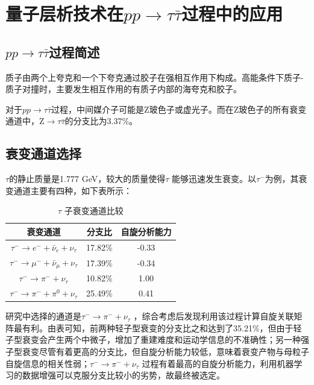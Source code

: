 \section{量子层析技术在$pp\to \tau \bar{\tau}$过程中的应用}
\label{sec:twopthree}

\subsection{$pp \to \tau \bar{\tau}$过程简述}
\label{sec:twopthreepone}

质子由两个上夸克和一个下夸克通过胶子在强相互作用下构成。高能条件下质子-质子对撞时，主要发生相互作用的有质子内部的海夸克和胶子。

对于$pp \to \tau \bar{\tau}$过程，中间媒介子可能是Z玻色子或虚光子。而在Z玻色子的所有衰变通道中，$\mathrm{Z} \to \tau \bar{\tau}$的分支比为3.37\%\cite{ref18}。

\subsection{衰变通道选择}
\label{sec:twopthreeptwo}
$\tau$的静止质量是1.777 GeV，较大的质量使得$\tau$ 能够迅速发生衰变。以$\tau^-$为例，其衰变通道主要有四种，如下表所示：
\begin{table}[htbp]
  \centering
  \caption{$\tau$ 子衰变通道比较}
  \label{tab:tau-decay}
  \renewcommand{\arraystretch}{1.3}
  \begin{tabular}{c c c}
    \toprule[1.5pt]
    衰变通道 & 分支比\cite{ref19} & 自旋分析能力\cite{ref7} \\
    \midrule[1pt]
    $\tau^-\to e^- + \bar{\nu}_e + \nu_\tau$ & 17.82\% & -0.33 \\
    $\tau^-\to \mu^- + \bar{\nu}_\mu + \nu_\tau$ & 17.39\% & -0.34 \\
    $\tau^-\to \pi^- + \nu_\tau$ & 10.82\% & 1.00 \\
    $\tau^-\to \pi^- + \pi^0 + \nu_\tau$ & 25.49\% & 0.41 \\
    \bottomrule[1.5pt]
  \end{tabular}
\end{table}

研究中选择的通道是$\tau^- \to \pi^- + \nu_{\tau}$ ，综合考虑后发现利用该过程计算自旋关联矩阵最有利。由表可知，前两种轻子型衰变的分支比之和达到了35.21\%，但由于轻子型衰变会产生两个中微子，增加了重建难度和运动学信息的不准确性；另一种强子型衰变尽管有着更高的分支比，但自旋分析能力较低，意味着衰变产物与母粒子自旋信息的相关性弱；$\tau^- \to \pi^- + \nu_{\tau}$ 过程有着最高的自旋分析能力，利用机器学习的数据增强可以克服分支比较小的劣势，故最终被选定。

